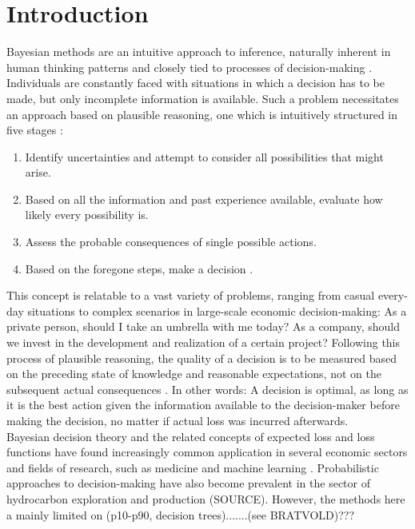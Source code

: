 \chapter{Introduction} \label{chap:intro}
Bayesian methods are an intuitive approach to inference, naturally inherent in human thinking patterns and closely tied to processes of decision-making \citep{berger2013stat, davidson2015, jaynes1986bayesian}. Individuals are constantly faced with situations in which a decision has to be made, but only incomplete information is available. Such a problem necessitates an approach based on plausible reasoning, one which is intuitively structured in five stages \citep{jaynes1986bayesian}:
\begin{enumerate}
	\item Identify uncertainties and attempt to consider all possibilities that might arise.
	\item Based on all the information and past experience available, evaluate how likely every possibility is.
	\item Assess the probable consequences of single possible actions.
	\item Based on the foregone steps, make a decision \citep{jaynes1986bayesian}.
\end{enumerate}
This concept is relatable to a vast variety of problems, ranging from casual every-day situations to complex scenarios in large-scale economic decision-making: As a private person, should I take an umbrella with me today? As a company, should we invest in the development and realization of a certain project? Following this process of plausible reasoning, the quality of a decision is to be measured based on the preceding state of knowledge and reasonable expectations, not on the subsequent actual consequences \citep{jaynes1986bayesian}. In other words: A decision is optimal, as long as it is the best action given the information available to the decision-maker before making the decision, no matter if actual loss was incurred afterwards.\\
Bayesian decision theory and the related concepts of expected loss and loss functions have found increasingly common application in several economic sectors and fields of research, such as medicine \citep{ashby2000evidence, ashby2006bayesian, moye2006statistical} and machine learning \citep{barber2012bayesian, theodoridis2015machine}. Probabilistic approaches to decision-making have also become prevalent in the sector of hydrocarbon exploration and production (SOURCE). However, the methods here a mainly limited on (p10-p90, decision trees).......(see BRATVOLD)???\\
